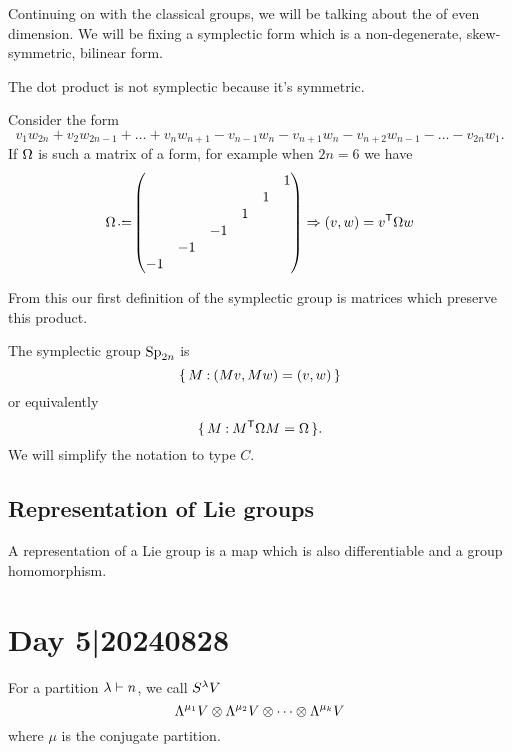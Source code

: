 \documentclass[12pt]{memoir}
\begin{document}
Continuing on with the classical groups, we will be talking about the  of even dimension. We will be fixing a symplectic form which is a non-degenerate, skew-symmetric, bilinear form.

\begin{Ex}
    The dot product is not symplectic because it's symmetric.
\end{Ex}

\begin{Ex}
    Consider the form 
    $$v_1w_{2n}+v_2w_{2n-1}+\dots+v_nw_{n+1}-v_{n-1}w_n-v_{n+1}w_{n}-v_{n+2}w_{n-1}-\dots-v_{2n}w_{1}.$$
    If $\Omega$ is such a matrix of a form, for example when $2n=6$ we have 
    $$
    \Om\defeq
    \begin{pmatrix}
        &&&&&1\\
        &&&&1&\\
        &&&1&&\\
        &&-1&&&\\
        &-1&&&&\\
        -1&&&&&
    \end{pmatrix}
    \To (v,w)=v^{\sT}\Om w
    $$
\end{Ex}

From this our first definition of the symplectic group is matrices which preserve this product. 

\begin{Def}
    The symplectic group $\mathrm{Sp}_{2n}$ is 
    $$\{\,M\mathbin{:}(Mv,Mw)=(v,w)\,\}$$
    or equivalently
    $$\{\,M\mathbin{:} M^{\mathsf{T}}\Omega M=\Omega\,\}.$$
    We will simplify the notation to type $C$.
\end{Def}

\subsection{Representation of Lie groups}

\begin{Def}
    A representation of a Lie group is a map 
which is also differentiable and a group homomorphism.
\end{Def}

\section{Day 5|20240828}

For a partition $\lambda\vdash n$, we call $S^\lambda V$
$$\Lambda^{\mu_1}V\otimes\Lambda^{\mu_2}V\otimes\cdots\otimes\Lambda^{\mu_k}V$$
where $\mu$ is the conjugate partition. 
\end{document}
